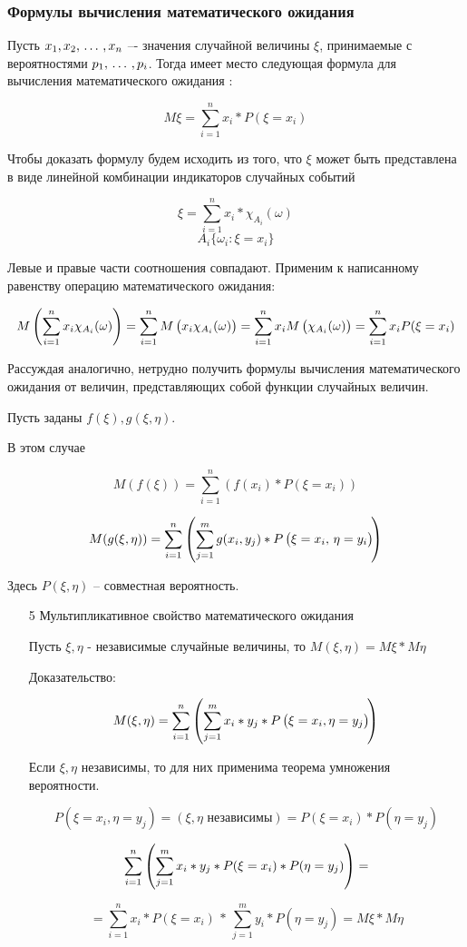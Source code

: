 \documentclass[a4paper,12pt]{report}
\begin{document}
\subsubsection{Формулы вычисления математического ожидания}

	Пусть $x_1,x_2, \,\ldots\, ,x_n$ –-  значения случайной величины $\xi$, принимаемые с вероятностями $p_1, \,\ldots\, ,p_i$. Тогда имеет место следующая формула для вычисления математического ожидания :

	$$
	  M\xi=\sum^n_{i=1}x_i*P(\xi=x_i)
	$$

	Чтобы доказать формулу будем исходить из того, что $\xi$ может быть представлена в виде линейной комбинации индикаторов случайных событий

	$$
	  \xi = \sum^n_{i=1}x_i*\chi_{A_i}(\omega)
	$$ $$
	  A_i \{\omega_i : \xi = x_i\}
	$$

	Левые и правые части соотношения совпадают. Применим к написанному равенству операцию математического ожидания: 

	$$	
	  M\left(\sum^n_{i=1}x_i\chi_{A_i}(\omega)\right) 
	    = \sum^n_{i=1}M\left(x_i\strut\chi_{A_i}(\omega)\right) 
	    = \sum^n_{i=1}x_iM\left(\strut\chi_{A_i}(\omega)\right) 
	    = \sum^n_{i=1}x_iP(\xi=x_i)	
	$$

	Рассуждая аналогично, нетрудно получить формулы вычисления математического ожидания от величин, представляющих собой функции случайных величин. 

	Пусть заданы $f(\xi),g(\xi,\eta)$.

	В этом случае 

	$$
	  M(f(\xi)) = \sum^n_{i=1}\left(f(x_i)*P(\xi=x_i)\right) 
	$$

	$$
	  M(g(\xi,\eta)) = \sum^n_{i=1}
	    \left(   
	      \sum^m_{j=1}g(x_i,y_j)*P
	        \left(
	          \xi=x_i,\strut\,\eta=y_i
	        \right) \!
	    \right) 
	$$

	Здесь $P(\xi,\eta)$ – совместная вероятность.


	\begin{enumerate}

	\item[5] Мультипликативное свойство математического ожидания

		Пусть $\xi,\eta$ - независимые случайные величины, то $M(\xi,\eta) =  M\xi * M\eta$

		Доказательство:

		$$
		  M(\xi,\eta) = \sum^n_{i=1}
		    \left(
		      \sum^m_{j=1}x_i*y_j*\strut P
		        \left(
		          \xi=x_i,\strut\eta=y_j
		        \right) \!
		    \right)
		$$

		Если $\xi,\eta$ независимы, то для них применима теорема умножения вероятности. 

		$$
		  P(\xi=x_i,\eta=y_j) 
		    = (\xi,\eta \mbox{ независимы})
		    = P(\xi=x_i)*P(\eta=y_j)
		$$
		
		$$
		  \sum^n_{i=1}
		    \left(
		      \sum^m_{j=1}x_i*y_j*\strut P(\xi=x_i)*P(\eta=y_j)
		    \right)
		  =
		$$
		
		$$
		  = \sum^n_{i=1}x_i*P(\xi=x_i)  \, * \, 
		    \sum^m_{j=1}y_i*P(\eta=y_j) 
		  = M\xi*M\eta
		$$

	\end{enumerate}
\end{document}
